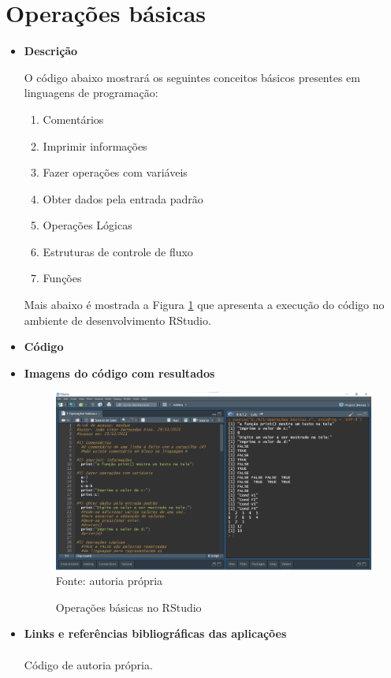   \section{Operações básicas}
  	\begin{itemize}
  		\item \textbf{Descrição}
  		
  		  O código abaixo mostrará os seguintes conceitos básicos presentes em linguagens de programação:
  		  \begin{enumerate}
  			\item Comentários
  			\item Imprimir informações
  			\item Fazer operações com variáveis
  			\item Obter dados pela entrada padrão
  			\item Operações Lógicas
  			\item Estruturas de controle de fluxo
  			\item Funções
  		\end{enumerate}
  		  Mais abaixo é mostrada a Figura \ref{Codigo_1} que apresenta a execução do código no ambiente de desenvolvimento RStudio.
  	
  		\item \textbf{Código}
  		\color{blue}
  		
  		\color{black}
  		
  		  
  		\item \textbf{Imagens do código com resultados}
  		  \begin{figure}[H]  \label{Codigo_1}
  		  	\centering
  		  		\caption{Operações básicas no RStudio}
  		  		\includegraphics[width=16cm]{PicturesJoaoDias/Codigos/Codigo1.png}
  		  		{\tiny \sf Fonte: autoria própria}
  		  \end{figure}
  		  
  		\item \textbf{Links e referências bibliográficas das aplicações}
  		\\ \\
  		  Código de autoria própria.
  		
  	\end{itemize}
  
